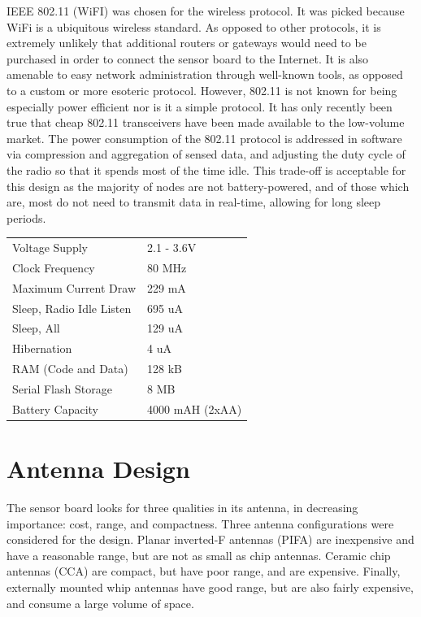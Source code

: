 IEEE 802.11 (WiFI) was chosen for the wireless protocol. It was picked because WiFi is a ubiquitous wireless standard. As opposed to other protocols, it is extremely unlikely that additional routers or gateways would need to be purchased in order to connect the sensor board to the Internet. It is also amenable to easy network administration through well-known tools, as opposed to a custom or more esoteric protocol. However, 802.11 is not known for being especially power efficient nor is it a simple protocol. It has only recently been true that cheap 802.11 transceivers have been made available to the low-volume market. The power consumption of the 802.11 protocol is addressed in software via compression and aggregation of sensed data, and adjusting the duty cycle of the radio so that it spends most of the time idle. This trade-off is acceptable for this design as the majority of nodes are not battery-powered, and of those which are, most do not need to transmit data in real-time, allowing for long sleep periods.

\begin{table}[h]
\begin{tabular}{ll}
Voltage Supply           & 2.1 - 3.6V \\
Clock Frequency          & 80 MHz     \\
Maximum Current Draw     & 229 mA     \\
Sleep, Radio Idle Listen & 695 uA     \\
Sleep, All               & 129 uA \\
Hibernation              & 4 uA     \\
RAM (Code and Data)      & 128 kB     \\
Serial Flash Storage     & 8 MB		\\
Battery Capacity		 & 4000 mAH (2xAA)	      
\end{tabular}
\end{table}


\section{Antenna Design}

The sensor board looks for three qualities in its antenna, in decreasing importance: cost, range, and compactness. Three antenna configurations were considered for the design. Planar inverted-F antennas (PIFA) are inexpensive and have a reasonable range, but are not as small as chip antennas. Ceramic chip antennas (CCA) are compact, but have poor range, and are expensive. Finally, externally mounted whip antennas have good range, but are also fairly expensive, and consume a large volume of space.

